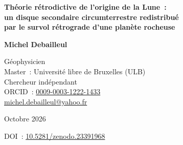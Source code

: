 \documentclass[11pt,a4paper]{article}
\begin{document}
\thispagestyle{empty}
\begin{center}
{\LARGE\bfseries Théorie rétrodictive de l'origine de la Lune~:\\[4pt]
un disque secondaire circumterrestre redistribué\\[4pt]
par le survol rétrograde d'une planète rocheuse\par}
\vspace{16pt}
{\large\bfseries Michel Debailleul\par}
\vspace{3pt}
Géophysicien\\
Master~: Université libre de Bruxelles (ULB)\\
Chercheur indépendant\\
ORCID~: \href{https://orcid.org/0009-0003-1222-1433}{0009-0003-1222-1433}\\
\href{mailto:michel.debailleul@yahoo.fr}{michel.debailleul@yahoo.fr}\par
\vspace{6pt}
Octobre 2026\par
\smallskip DOI~: \href{https://doi.org/10.5281/zenodo.23391968}{10.5281/zenodo.23391968}\par
\end{center}
\vspace{4pt}
\end{document}
